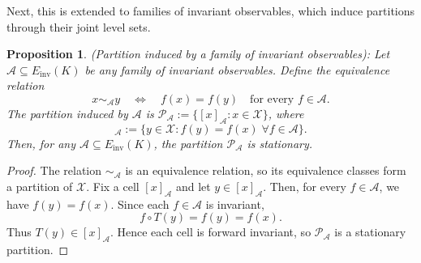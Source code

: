 \documentclass[letterpaper, 10 pt, conference]{ieeeconf}
\newcommand{\Xc}{\mathcal{X}}
\newcommand{\longthmtitle}[1]{\mbox{}{\textit{(#1):}}}
\newtheorem{proposition}[theorem]{Proposition}
\begin{document}
Next, this is extended to families of invariant observables, which induce partitions through their joint level sets.

\begin{proposition}\longthmtitle{Partition induced by a family of invariant observables}
Let $\mathcal A\subseteq E_{\text{inv}}(K)$ be any family of invariant observables. Define the equivalence relation
\begin{equation}
    x\sim_{\mathcal A} y
    \quad\Longleftrightarrow\quad
    f(x)=f(y)\quad\text{for every } f\in\mathcal A.
\end{equation}
The partition induced by $\mathcal A$ is $\mathcal P_{\mathcal A}:=\{[x]_{\mathcal A}:x\in\Xc\}$, where
\begin{equation}
    [x]_{\mathcal A}:=\{y\in\Xc:f(y)=f(x)\;\forall f\in\mathcal A\}.
\end{equation}
Then, for any $\mathcal A\subseteq E_{\text{inv}}(K)$, the partition $\mathcal P_{\mathcal A}$ is stationary.
\end{proposition}

\begin{proof}
The relation $\sim_{\mathcal A}$ is an equivalence relation, so its equivalence classes form a partition of $\Xc$. Fix a cell $[x]_{\mathcal A}$ and let $y\in[x]_{\mathcal A}$. Then, for every $f\in\mathcal A$, we have $f(y)=f(x).$ Since each $f\in\mathcal A$ is invariant,
\begin{equation}
    f \circ T (y)=f(y)=f(x).
\end{equation}
Thus $T(y)\in[x]_{\mathcal A}$. Hence each cell is forward invariant, so $\mathcal P_{\mathcal A}$ is a stationary partition.
\end{proof}
\end{document}
